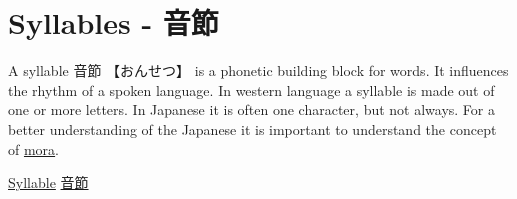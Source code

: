 \section{Syllables - 音節} \label{sec:Syllable}

A syllable {音節}  {【おんせつ】}  is a phonetic building block for words. It
influences the rhythm of a spoken language. In western language a syllable is
made out of one or more letters. In Japanese it is often one character, but not
always. For a better understanding of the Japanese it is important to
understand the concept of \hyperref[sec:Mora]{mora}.

\Link \href{http://en.wikipedia.org/wiki/Syllable}{Syllable}
\Link \href{http://ja.wikipedia.org/wiki/%E9%9F%B3%E7%AF%80}{音節}

